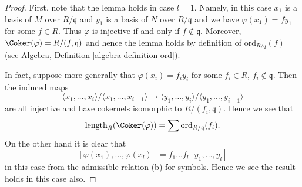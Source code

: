 \begin{proof}
First, note that the lemma holds in case $l = 1$.
Namely, in this case $x_1$ is a basis of $M$ over $R/\mathfrak q$
and $y_1$ is a basis of $N$ over $R/\mathfrak q$ and we have
$\varphi(x_1) = fy_1$ for some $f \in R$. Thus $\varphi$ is injective
if and only if $f \not \in \mathfrak q$. Moreover,
$\Coker(\varphi) = R/(f, \mathfrak q)$ and hence the lemma
holds by definition of $\text{ord}_{R/q}(f)$
(see Algebra, Definition \ref{algebra-definition-ord}).

\medskip\noindent
In fact, suppose more generally that $\varphi(x_i) = f_iy_i$ for some
$f_i \in R$, $f_i \not \in \mathfrak q$. Then the induced maps
$$
\langle x_1, \ldots, x_i\rangle / \langle x_1, \ldots, x_{i - 1}\rangle
\longrightarrow
\langle y_1, \ldots, y_i\rangle / \langle y_1, \ldots, y_{i - 1}\rangle
$$
are all injective and have cokernels isomorphic to
$R/(f_i, \mathfrak q)$. Hence we see that
$$
\text{length}_R(\Coker(\varphi)) = \sum \text{ord}_{R/\mathfrak q}(f_i).
$$
On the other hand it is clear that
$$
[\varphi(x_1), \ldots, \varphi(x_l)] = f_1 \ldots f_l [y_1, \ldots, y_l]
$$
in this case from the admissible relation (b) for symbols.
Hence we see the result holds in this case also.


\end{proof}
